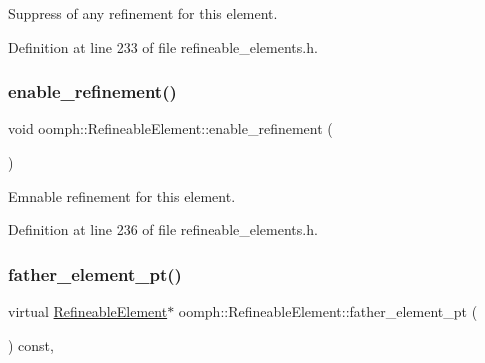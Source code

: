 Suppress of any refinement for this element. 



Definition at line 233 of file refineable\+\_\+elements.\+h.

\mbox{\label{classoomph_1_1RefineableElement_ab633c494a3815e0dc68139f7175eb3c7}} 
\subsubsection{\texorpdfstring{enable\+\_\+refinement()}{enable\_refinement()}}
{\footnotesize\ttfamily void oomph\+::\+Refineable\+Element\+::enable\+\_\+refinement (\begin{DoxyParamCaption}{ }\end{DoxyParamCaption})\hspace{0.3cm}{\ttfamily [inline]}}



Emnable refinement for this element. 



Definition at line 236 of file refineable\+\_\+elements.\+h.

\mbox{\label{classoomph_1_1RefineableElement_aa15517a39ebe72b751b514081f6eba60}} 
\subsubsection{\texorpdfstring{father\+\_\+element\+\_\+pt()}{father\_element\_pt()}}
{\footnotesize\ttfamily virtual \hyperlink{classoomph_1_1RefineableElement}{Refineable\+Element}$\ast$ oomph\+::\+Refineable\+Element\+::father\+\_\+element\+\_\+pt (\begin{DoxyParamCaption}{ }\end{DoxyParamCaption}) const\hspace{0.3cm}{\ttfamily [inline]}, {\ttfamily [virtual]}}



